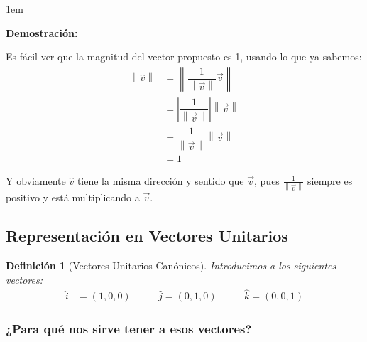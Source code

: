 \documentclass[12pt, fleqn]{report}                             %
\newenvironment{SmallIndentation}[1][0.75em]                    %
    {\begin{adjustwidth}{#1}{}\begin{footnotesize}}                 %
    {\end{footnotesize}\end{adjustwidth}}                           %
\DeclareMathOperator \MegaSpace {\quad \quad}                   %
\newcommand{\abs}[1]{\left\lvert #1 \right\lvert}               %
\newcommand{\Abs}[1]{\left\lVert #1 \right\lVert}               %
\newtheorem{Definition}{Definición}[section]                    %
\begin{document}
                \begin{SmallIndentation}[1em]
                    \textbf{Demostración:}

                    Es fácil ver que la magnitud del vector propuesto es 1, usando lo que ya sabemos:
                    \begin{align*}
                        \Abs{\hat{v}} 
                            &= \Abs{\dfrac{1}{\Abs{\vec{v}}} \vec{v}}               \\
                            &= \abs{\dfrac{1}{\Abs{\vec{v}}}} \Abs{\vec{v}}         \\
                            &= \dfrac{1}{\Abs{\vec{v}}} \Abs{\vec{v}}               \\
                            &= 1
                    \end{align*}

                    Y obviamente $\hat{v}$ tiene la misma dirección y sentido que $\vec{v}$,
                    pues $\frac{1}{\Abs{\vec{v}}}$ siempre es positivo y está multiplicando a $\vec{v}$.

                \end{SmallIndentation}
            
            \clearpage
            \subsection{Representación en Vectores Unitarios}
        
                \begin{Definition}[Vectores Unitarios Canónicos]
                    
                    Introducimos a los siguientes vectores:
                    \begin{align}
                        \hat{i} &= (1, 0, 0) \MegaSpace \hat{j} = (0, 1, 0) \MegaSpace \hat{k} = (0, 0, 1)
                    \end{align}

                \end{Definition}
            
                \subsubsection{¿Para qué nos sirve tener a esos vectores?}
\end{document}
